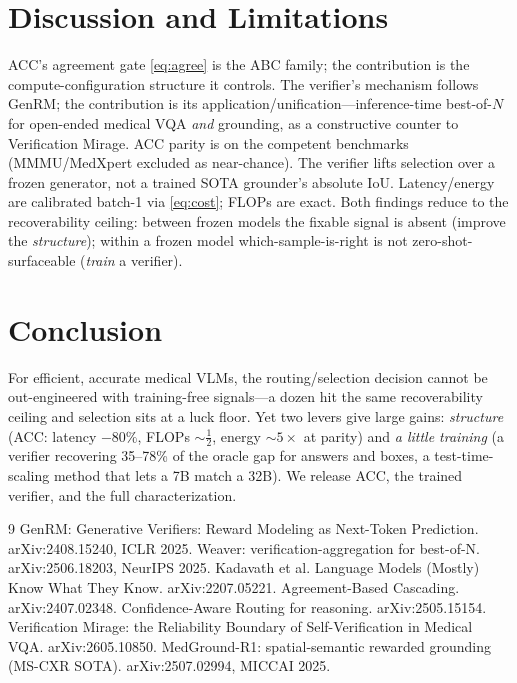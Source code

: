 \documentclass[conference]{IEEEtran}
\begin{document}
\section{Discussion and Limitations}
ACC's agreement gate \eqref{eq:agree} is the ABC family; the contribution is the compute-configuration structure it controls. The verifier's mechanism follows GenRM; the contribution is its application/unification---inference-time best-of-$N$ for open-ended medical VQA \emph{and} grounding, as a constructive counter to Verification Mirage. ACC parity is on the competent benchmarks (MMMU/MedXpert excluded as near-chance). The verifier lifts selection over a frozen generator, not a trained SOTA grounder's absolute IoU. Latency/energy are calibrated batch-1 via \eqref{eq:cost}; FLOPs are exact. Both findings reduce to the recoverability ceiling: between frozen models the fixable signal is absent (improve the \emph{structure}); within a frozen model which-sample-is-right is not zero-shot-surfaceable (\emph{train} a verifier).

\section{Conclusion}
For efficient, accurate medical VLMs, the routing/selection decision cannot be out-engineered with training-free signals---a dozen hit the same recoverability ceiling and selection sits at a luck floor. Yet two levers give large gains: \emph{structure} (ACC: latency $-80\%$, FLOPs ${\sim}\tfrac12$, energy ${\sim}5\times$ at parity) and \emph{a little training} (a verifier recovering 35--78\% of the oracle gap for answers and boxes, a test-time-scaling method that lets a 7B match a 32B). We release ACC, the trained verifier, and the full characterization.

\begin{thebibliography}{9}
\footnotesize
{} GenRM: Generative Verifiers: Reward Modeling as Next-Token Prediction. arXiv:2408.15240, ICLR 2025.
 Weaver: verification-aggregation for best-of-N. arXiv:2506.18203, NeurIPS 2025.
 Kadavath et al. Language Models (Mostly) Know What They Know. arXiv:2207.05221.
 Agreement-Based Cascading. arXiv:2407.02348.
 Confidence-Aware Routing for reasoning. arXiv:2505.15154.
 Verification Mirage: the Reliability Boundary of Self-Verification in Medical VQA. arXiv:2605.10850.
 MedGround-R1: spatial-semantic rewarded grounding (MS-CXR SOTA). arXiv:2507.02994, MICCAI 2025.
\end{thebibliography}
\end{document}
